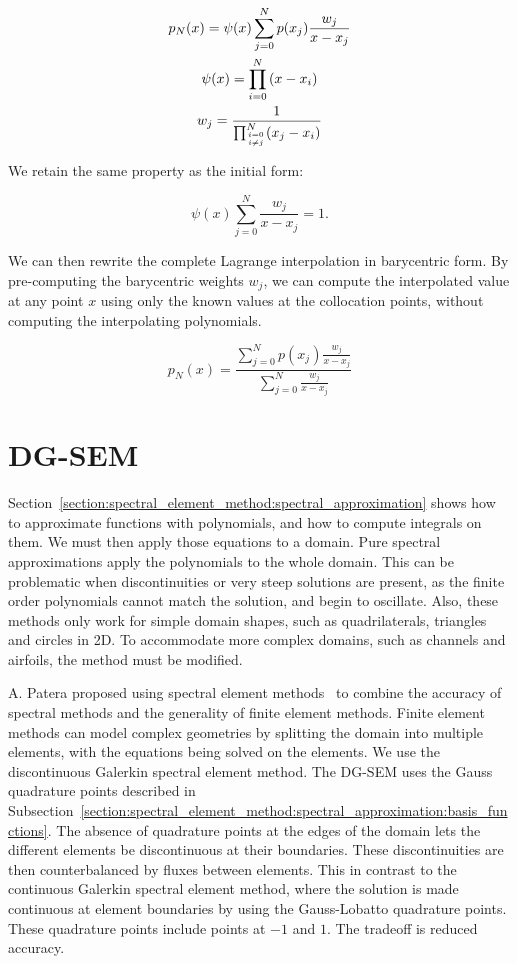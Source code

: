 \begin{gather}
	p_N(x) = \psi(x)\sum_{j = 0}^{N}p(x_j)\frac{w_j}{x - x_j} \\
	\psi(x) = \prod_{i = 0}^{N}\left ( x - x_i \right ) \\
	w_j = \frac{1}{\prod_{\genfrac{}{}{0pt}{2}{i = 0}{i \neq j}}^{N}(x_j - x_i)}
\end{gather}

We retain the same property as the initial form:

\begin{equation}
	\psi(x)\sum_{j = 0}^{N}\frac{w_j}{x - x_j} = 1.
\end{equation}

We can then rewrite the complete Lagrange interpolation in barycentric form. By pre-computing the
barycentric weights $w_j$, we can compute the interpolated value at any point $x$ using only the
known values at the collocation points, without computing the interpolating polynomials. 

\begin{equation}
	p_N(x) = \frac{\sum_{j = 0}^{N} p(x_j)\frac{w_j}{x - x_j}}{\sum_{j = 0}^{N}\frac{w_j}{x - x_j}}
\end{equation}

\section{DG-SEM} \label{section:spectral_element_method:dg_sem}
Section~\ref{section:spectral_element_method:spectral_approximation} shows how to approximate
functions with polynomials, and how to compute integrals on them. We must then apply those equations
to a domain. Pure spectral approximations apply the polynomials to the whole domain. This can be
problematic when discontinuities or very steep solutions are present, as the finite order
polynomials cannot match the solution, and begin to oscillate. Also, these methods only work for
simple domain shapes, such as quadrilaterals, triangles and circles in 2D. To accommodate more
complex domains, such as channels and airfoils, the method must be modified.

A. Patera proposed using spectral element methods~\cite{Patera1984} to combine the accuracy of
spectral methods and the generality of finite element methods. Finite element methods can model
complex geometries by splitting the domain into multiple elements, with the equations being solved
on the elements. We use the discontinuous Galerkin spectral element method. The DG-SEM uses the 
Gauss quadrature points described in
Subsection~\ref{section:spectral_element_method:spectral_approximation:basis_functions}. The absence
of quadrature points at the edges of the domain lets the different elements be discontinuous at
their boundaries. These discontinuities are then counterbalanced by fluxes between elements. This in
contrast to the continuous Galerkin spectral element method, where the solution is made continuous 
at element boundaries by using the Gauss-Lobatto quadrature points. These quadrature points include
points at $-1$ and $1$. The tradeoff is reduced accuracy.

